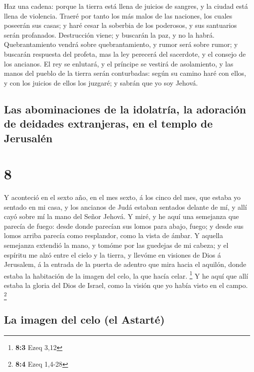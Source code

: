  Haz una cadena: porque la tierra está llena de juicios de
sangres, y la ciudad está llena de violencia.  Traeré por
tanto los más malos de las naciones, los cuales poseerán sus casas; y
haré cesar la soberbia de los poderosos, y sus santuarios serán
profanados.  Destrucción viene; y buscarán la paz, y no la
habrá.  Quebrantamiento vendrá sobre quebrantamiento, y
rumor será sobre rumor; y buscarán respuesta del profeta, mas la ley
perecerá del sacerdote, y el consejo de los ancianos.  El
rey se enlutará, y el príncipe se vestirá de asolamiento, y las manos
del pueblo de la tierra serán conturbadas: según su camino haré con
ellos, y con los juicios de ellos los juzgaré; y sabrán que yo soy
Jehová.

\hypertarget{las-abominaciones-de-la-idolatruxeda-la-adoraciuxf3n-de-deidades-extranjeras-en-el-templo-de-jerusaluxe9n}{%
\subsection{Las abominaciones de la idolatría, la adoración de deidades
extranjeras, en el templo de
Jerusalén}\label{las-abominaciones-de-la-idolatruxeda-la-adoraciuxf3n-de-deidades-extranjeras-en-el-templo-de-jerusaluxe9n}}

\hypertarget{section-7}{%
\section{8}\label{section-7}}

 Y aconteció en el sexto año, en el mes sexto, á los cinco
del mes, que estaba yo sentado en mi casa, y los ancianos de Judá
estaban sentados delante de mí, y allí cayó sobre mí la mano del Señor
Jehová.  Y miré, y he aquí una semejanza que parecía de
fuego: desde donde parecían sus lomos para abajo, fuego; y desde sus
lomos arriba parecía como resplandor, como la vista de ámbar.
 Y aquella semejanza extendió la mano, y tomóme por las
guedejas de mi cabeza; y el espíritu me alzó entre el cielo y la tierra,
y llevóme en visiones de Dios á Jerusalem, á la entrada de la puerta de
adentro que mira hacia el aquilón, donde estaba la habitación de la
imagen del celo, la que hacía celar. \footnote{\textbf{8:3} Ezeq 3,12}
 Y he aquí que allí estaba la gloria del Dios de Israel,
como la visión que yo había visto en el campo. \footnote{\textbf{8:4}
  Ezeq 1,4-28}

\hypertarget{la-imagen-del-celo-el-astartuxe9}{%
\subsection{La imagen del celo (el
Astarté)}\label{la-imagen-del-celo-el-astartuxe9}}


